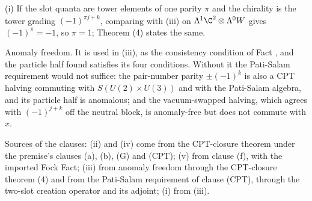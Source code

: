 (i) If the slot quanta are tower elements of one parity $\pi$ and the chirality is the tower grading $(-1)^{\pi j + k}$, comparing with (iii) on $\Lambda^{1}\C^{2} \otimes \Lambda^{0}W$ gives $(-1)^{\pi} = -1$, so $\pi = 1$; Theorem (4) states the same.

Anomaly freedom. It is used in (iii), as the consistency condition of Fact , and the particle half found satisfies its four conditions. Without it the Pati-Salam requirement would not suffice: the pair-number parity $\pm(-1)^{k}$ is also a CPT halving commuting with $S(U(2) \times U(3))$ and with the Pati-Salam algebra, and its particle half is anomalous; and the vacuum-swapped halving, which agrees with $(-1)^{j + k}$ off the neutral block, is anomaly-free but does not commute with $x$.

Sources of the clauses: (ii) and (iv) come from the CPT-closure theorem under the premise's clauses (a), (b), (G) and (CPT); (v) from clause (f), with the imported Fock Fact; (iii) from anomaly freedom through the CPT-closure theorem (4) and from the Pati-Salam requirement of clause (CPT), through the two-slot creation operator and its adjoint; (i) from (iii).
